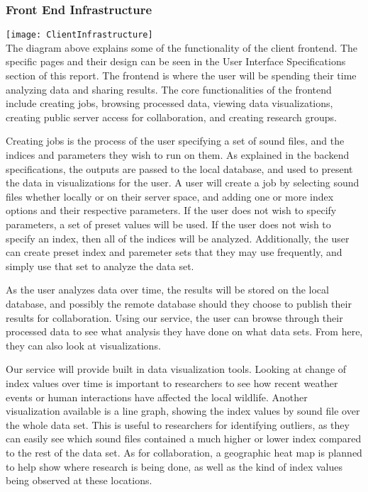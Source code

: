 \subsubsection{Front End Infrastructure}
\texttt{[image: ClientInfrastructure]} \\
The diagram above explains some of the functionality of the client frontend. The specific pages and their design can be seen in the User Interface Specifications section of this report. The frontend is where the user will be spending their time analyzing data and sharing results. The core functionalities of the frontend include creating jobs, browsing processed data, viewing data visualizations, creating public server access for collaboration, and creating research groups.\par
Creating jobs is the process of the user specifying a set of sound files, and the indices and parameters they wish to run on them. As explained in the backend specifications, the outputs are passed to the local database, and used to present the data in visualizations for the user. A user will create a job by selecting sound files whether locally or on their server space, and adding one or more index options and their respective parameters. If the user does not wish to specify parameters, a set of preset values will be used. If the user does not wish to specify an index, then all of the indices will be analyzed. Additionally, the user can create preset index and paremeter sets that they may use frequently, and simply use that set to analyze the data set.\par
As the user analyzes data over time, the results will be stored on the local database, and possibly the remote database should they choose to publish their results for collaboration. Using our service, the user can browse through their processed data to see what analysis they have done on what data sets. From here, they can also look at visualizations.\par
Our service will provide built in data visualization tools. Looking at change of index values over time is important to researchers to see how recent weather events or human interactions have affected the local wildlife. Another visualization available is a line graph, showing the index values by sound file over the whole data set. This is useful to researchers for identifying outliers, as they can easily see which sound files contained a much higher or lower index compared to the rest of the data set. As for collaboration, a geographic heat map is planned to help show where research is being done, as well as the kind of index values being observed at these locations.\par
